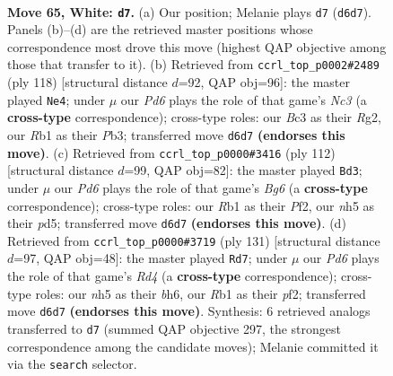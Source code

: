 \documentclass[11pt]{article}
\begin{document}
\clearpage

\begin{figure}[p]\centering
\begin{subfigure}{0.46\textwidth}\centering
\resizebox{\linewidth}{!}{%
\newchessgame
\chessboard[
  setfen={2bq1k2/5p2/3P1n2/6Qn/2p4P/p1B2pP1/P6K/1R6 w - - 10 65},
  showmover=false,
  pgfstyle=straightmove, color=movearrow, markmove={d6-d7}
]}
\caption{}
\end{subfigure}\hfill
\begin{subfigure}{0.46\textwidth}\centering
\resizebox{\linewidth}{!}{%
\newchessgame
\chessboard[
  setfen={7k/7n/1pp1bn1q/p3Q3/P1P4p/1PN5/6RK/8 w - - 0 60},
  showmover=false,
  pgfstyle=straightmove, color=movearrow, markmove={c3-e4}
]}
\caption{}
\end{subfigure}
\\[4pt]
\begin{subfigure}{0.46\textwidth}\centering
\resizebox{\linewidth}{!}{%
\newchessgame
\chessboard[
  setfen={2k5/2p3p1/2Qnq1Bp/3p3P/3P4/5P2/5PK1/8 w - - 15 57},
  showmover=false,
  pgfstyle=straightmove, color=movearrow, markmove={g6-d3}
]}
\caption{}
\end{subfigure}\hfill
\begin{subfigure}{0.46\textwidth}\centering
\resizebox{\linewidth}{!}{%
\newchessgame
\chessboard[
  setfen={8/4QNqk/5ppB/3r1b1p/7P/8/5PPK/8 b - - 8 66},
  showmover=false,
  pgfstyle=straightmove, color=movearrow, markmove={d5-d7}
]}
\caption{}
\end{subfigure}
\caption{\textbf{Move 65, White: \texttt{d7}.} (a) Our position; Melanie plays \texttt{d7} (\texttt{d6d7}). Panels (b)--(d) are the retrieved master positions whose correspondence most drove this move (highest QAP objective among those that transfer to it). (b) Retrieved from \texttt{ccrl\_top\_p0002\#2489} (ply 118) [structural distance $d$=92, QAP obj=96]: the master played \texttt{Ne4}; under $\mu$ our \emph{Pd6} plays the role of that game's \emph{Nc3} (a \textbf{cross-type} correspondence); cross-type roles: our \emph{B}c3 as their \emph{R}g2, our \emph{R}b1 as their \emph{P}b3; transferred move \texttt{d6d7} \textbf{(endorses this move)}. (c) Retrieved from \texttt{ccrl\_top\_p0000\#3416} (ply 112) [structural distance $d$=99, QAP obj=82]: the master played \texttt{Bd3}; under $\mu$ our \emph{Pd6} plays the role of that game's \emph{Bg6} (a \textbf{cross-type} correspondence); cross-type roles: our \emph{R}b1 as their \emph{P}f2, our \emph{n}h5 as their \emph{p}d5; transferred move \texttt{d6d7} \textbf{(endorses this move)}. (d) Retrieved from \texttt{ccrl\_top\_p0000\#3719} (ply 131) [structural distance $d$=97, QAP obj=48]: the master played \texttt{Rd7}; under $\mu$ our \emph{Pd6} plays the role of that game's \emph{Rd4} (a \textbf{cross-type} correspondence); cross-type roles: our \emph{n}h5 as their \emph{b}h6, our \emph{R}b1 as their \emph{p}f2; transferred move \texttt{d6d7} \textbf{(endorses this move)}. Synthesis: 6 retrieved analogs transferred to \texttt{d7} (summed QAP objective 297, the strongest correspondence among the candidate moves); Melanie committed it via the \texttt{search} selector.}
\label{fig:thought-m128}
\end{figure}
\end{document}
